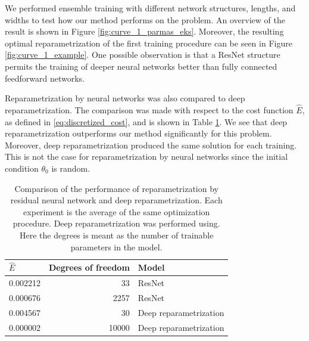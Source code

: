 We performed ensemble training with different network structures, lengths, and widths to test how our method performs on the problem. An overview of the result is shown in Figure \ref{fig:curve_1_parmas_eks}. Moreover, the resulting optimal reparametrization of the first training procedure can be seen in Figure \ref{fig:curve_1_example}. One possible observation is that a ResNet structure permits the training of deeper neural networks better than fully connected feedforward networks.

Reparametrization by neural networks was also compared to deep reparametrization. The comparison was made with respect to the cost function \(\hat E\), as defined in \eqref{eq:discretized_cost}, and is shown in Table \ref{tab:comare_res_palais}. We see that deep reparametrization outperforms our method significantly for this problem. Moreover, deep reparametrization produced the same solution for each training. This is not the case for reparametrization by neural networks since the initial condition \(\theta_0\) is random.
\begin{table}[b]
    \centering
    \begin{tabular}{lrl}
        \toprule
        \(\hat{E} \) & Degrees of freedom & Model         \\
        \midrule
        0.002212     & 33                 & ResNet        \\
        0.000676     & 2257               & ResNet        \\
        0.004567     & 30                 & Deep reparametrization \\
        0.000002     & 10000              & Deep reparametrization\\
        \bottomrule
    \end{tabular}
    \caption{Comparison of the performance of reparametrization by residual neural network and deep reparametrization. Each experiment is the average of the same optimization procedure. Deep reparametrization was performed using. Here the degrees is meant as the number of trainable parameters in the model.}\label{tab:comare_res_palais}
\end{table}
